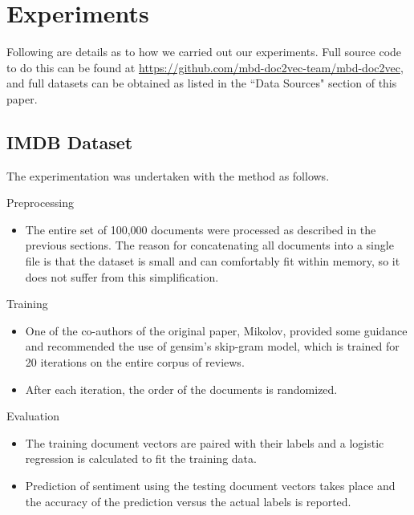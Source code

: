 \documentclass[11pt]{article}
\begin{document}
\section*{Experiments}
Following are details as to how we carried out our experiments.
Full source code to do this can be found at
\url{https://github.com/mbd-doc2vec-team/mbd-doc2vec}, and full datasets
can be obtained as listed in the ``Data Sources" section of this paper.

\subsection*{IMDB Dataset}
The experimentation was undertaken with the method as follows.

\renewcommand\labelitemi{{\boldmath$\cdot$}}
\begin{description}
  \item Preprocessing
    \begin{itemize}
      \item The entire set of 100,000 documents were processed as described
            in the previous sections.
            The reason for concatenating all documents into a single file
            is that the dataset is small and can comfortably fit within memory,
            so it does not suffer from this simplification.
    \end{itemize}
  \item Training
    \begin{itemize}
      \item One of the co-authors of the original paper, Mikolov, provided
            some guidance and recommended the use of gensim's skip-gram model,
            which is trained for 20 iterations on the entire corpus of reviews.
      \item After each iteration, the order of the documents is randomized.
    \end{itemize}
  \item Evaluation
    \begin{itemize}
      \item The training document vectors are paired with their labels and
            a logistic regression is calculated to fit the training data.
      \item Prediction of sentiment using the testing document vectors takes
            place and the accuracy of the prediction versus the actual labels
            is reported.
    \end{itemize}
\end{description}
\end{document}
